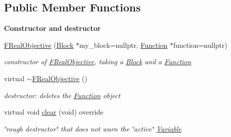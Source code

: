 \subsection*{Public Member Functions}
\begin{Indent}\textbf{ Constructor and destructor}\par
\begin{DoxyCompactItemize}
\item 
\mbox{\hyperlink{class_s_m_spp__di__unipi__it_1_1_f_real_objective_ac7f276033fd671a37ae57ac11d7763e7}{F\+Real\+Objective}} (\mbox{\hyperlink{class_s_m_spp__di__unipi__it_1_1_block}{Block}} $\ast$my\+\_\+block=nullptr, \mbox{\hyperlink{class_s_m_spp__di__unipi__it_1_1_function}{Function}} $\ast$function=nullptr)
\begin{DoxyCompactList}\small\item\em constructor of \mbox{\hyperlink{class_s_m_spp__di__unipi__it_1_1_f_real_objective}{F\+Real\+Objective}}, taking a \mbox{\hyperlink{class_s_m_spp__di__unipi__it_1_1_block}{Block}} and a \mbox{\hyperlink{class_s_m_spp__di__unipi__it_1_1_function}{Function}} \end{DoxyCompactList}\item 
\mbox{\label{class_s_m_spp__di__unipi__it_1_1_f_real_objective_aec4a3956123519c33d915543089a27b8}} 
virtual \mbox{\hyperlink{class_s_m_spp__di__unipi__it_1_1_f_real_objective_aec4a3956123519c33d915543089a27b8}{$\sim$\+F\+Real\+Objective}} ()
\begin{DoxyCompactList}\small\item\em destructor\+: deletes the \mbox{\hyperlink{class_s_m_spp__di__unipi__it_1_1_function}{Function}} object \end{DoxyCompactList}\item 
virtual void \mbox{\hyperlink{class_s_m_spp__di__unipi__it_1_1_f_real_objective_a9862fdd31593937c218bbda548c85fcc}{clear}} (void) override
\begin{DoxyCompactList}\small\item\em \char`\"{}rough destructor\char`\"{} that does not warn the \char`\"{}active\char`\"{} \mbox{\hyperlink{class_s_m_spp__di__unipi__it_1_1_variable}{Variable}} \end{DoxyCompactList}\end{DoxyCompactItemize}
\end{Indent}
